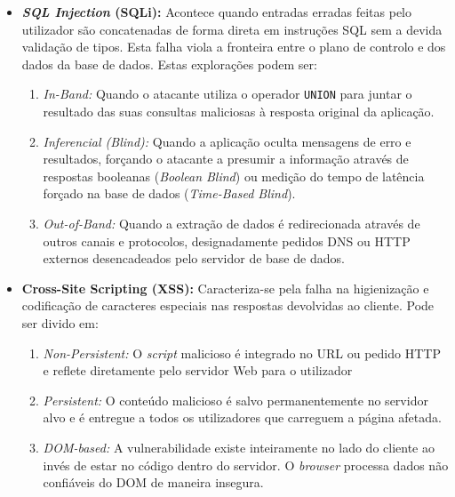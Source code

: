 \documentclass[11pt,a4paper]{article}
\begin{document}
\begin{itemize}
    \item \textbf{\textit{SQL Injection} (SQLi):} Acontece quando entradas erradas feitas pelo utilizador são concatenadas de forma direta em instruções SQL sem a devida validação de tipos. Esta falha viola a fronteira entre o plano de controlo e dos dados da base de dados. Estas explorações podem ser:
    
    \begin{enumerate}
        \item \textit{In-Band:} Quando o atacante utiliza o operador \texttt{UNION} para juntar o resultado das suas consultas maliciosas à resposta original da aplicação.
        \item \textit{Inferencial (Blind):} Quando a aplicação oculta mensagens de erro e resultados, forçando o atacante a presumir a informação através de respostas booleanas (\textit{Boolean Blind}) ou medição do tempo de latência forçado na base de dados (\textit{Time-Based Blind}).
        \item \textit{Out-of-Band:} Quando a extração de dados é redirecionada através de outros canais e protocolos, designadamente pedidos DNS ou HTTP externos desencadeados pelo servidor de base de dados.
    \end{enumerate}

    \newpage
    \item \textbf{Cross-Site Scripting (XSS):} Caracteriza-se pela falha na higienização e codificação de caracteres especiais nas respostas devolvidas ao cliente. Pode ser divido em:
    \begin{enumerate}
        \item \textit{Non-Persistent:} O \textit{script} malicioso é integrado no URL ou pedido HTTP e reflete diretamente pelo servidor Web para o utilizador
        \item \textit{Persistent:} O conteúdo malicioso é salvo permanentemente no servidor alvo e é entregue a todos os utilizadores que carreguem a página afetada.
        \item \textit{DOM-based:} A vulnerabilidade existe inteiramente no lado do cliente ao invés de estar no código dentro do servidor. O \textit{browser} processa dados não confiáveis do DOM de maneira insegura.
    \end{enumerate}
\end{itemize}
\end{document}
